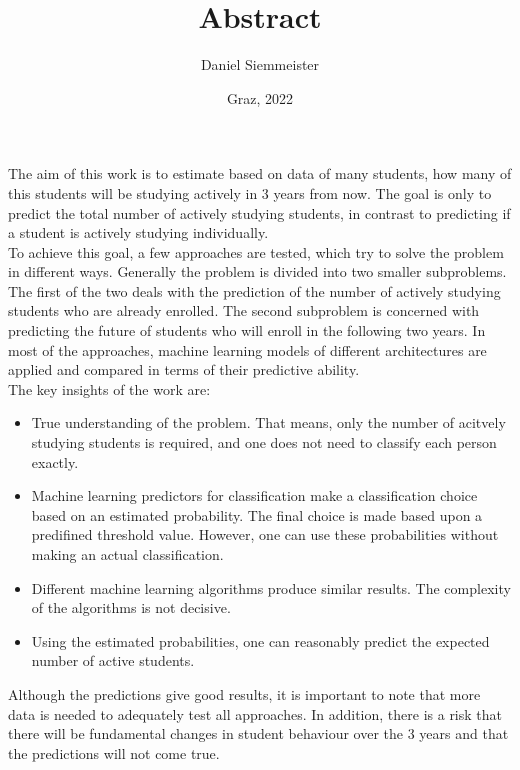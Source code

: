 \documentclass[a4paper, english,11pt]{article}
\title{Abstract}
\author{Daniel Siemmeister}
\date{Graz, 2022}
\begin{document}
\maketitle
\thispagestyle{empty}

The aim of this work is to estimate based on data of many students, how many of this students will be studying
actively in 3 years from now. The goal is only to predict the total number of actively studying students,
in contrast to predicting if a student is actively studying individually. \\

To achieve this goal, a few approaches are tested, which try to solve the problem in different ways.
Generally the problem is divided into two smaller subproblems. The first of the two deals with the prediction of the number of
actively studying students who are already enrolled.
The second subproblem is concerned with predicting the future of students who will enroll in the following two years.
In most of the approaches, machine learning models of different architectures are applied and compared in terms of their predictive ability. \\

The key insights of the work are:
\begin{itemize}
	\item True understanding of the problem. That means, only the number of acitvely studying students
	      is required, and one does not need to classify each person exactly.
	\item Machine learning predictors for classification make a classification choice based on an estimated probability.
	      The final choice is made based upon a predifined threshold value. However, one can use these probabilities without making an
	      actual classification.
	\item Different machine learning algorithms produce similar results. The complexity of the algorithms is not decisive.
	\item Using the estimated probabilities, one can reasonably predict the expected number of active students.
\end{itemize}

Although the predictions give good results, it is important to note that more data is needed to adequately test all approaches.
In addition, there is a risk that there will be fundamental changes in student behaviour over the 3 years and that the predictions
will not come true.
\end{document}
